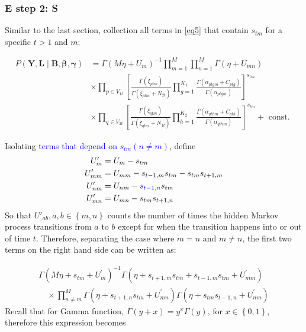 \documentclass{article}
\begin{document}
\subsubsection{E step 2: S}

Similar to the last section, collection all terms in \cref{eq5} that contain $s_{tm}$ for a specific $t>1$ and $m$:

\begin{equation*}
    \begin{aligned}
P(\mathbf{Y}, \mathbf{L} \mid \mathbf{B}, \boldsymbol{\beta}, \boldsymbol{\gamma})&=\Gamma\left(M \eta+U_{m}\right)^{-1} \prod_{m=1}^{M} \prod_{n=1}^{M} \Gamma\left(\eta+U_{m n}\right)  \\
& \times \prod_{p \in V_{1t}} \left[ \frac{\Gamma\left(\xi_{ptm}\right)}{\Gamma \left( \xi_{ptm} + N_{2t} \right)}\prod_{g=1}^{K_1}\frac{ \Gamma\left( \alpha_{ptgm} + C_{ptg} \right)}{\Gamma\left(\alpha_{ptgm}\right)}  \right]^{s_{tm}} \\
&\times \prod_{q \in V_{2t}}  \left[ \frac{\Gamma\left(\xi_{qtm}\right)}{\Gamma \left( \xi_{qtm} + N_{1t} \right)}\prod_{h=1}^{K_2}\frac{ \Gamma\left( \alpha_{qthm} + C_{qth} \right)}{\Gamma\left(\alpha_{qthm}\right)}  \right]^{s_{tm}}+\text { const. } 
    \end{aligned}
\end{equation*}


Isolating \textcolor{blue}{terms that depend on $s_{tm} (n \neq m)$}, define
$$
\begin{aligned} U_{m}^{\prime} &=U_{m}-s_{t m} \\ U_{m m}^{\prime} &=U_{m m}-s_{t-1, m} s_{t m}-s_{t m} s_{t+1, m} \\ U_{n m}^{\prime} &=U_{n m}-\textcolor{blue}{s_{t-1, n}} s_{t m} \\ U_{m n}^{\prime} &=U_{m n}-s_{t m} s_{t+1, n} \end{aligned}
$$
So that $U'_{ab}, a, b \in \left\{m,n \right\}$ counts the number of times the hidden Markov process transitions from $a$ to $b$ except for when the transition happens into or out of time $t$. Therefore, separating the case where $m = n$ and $m \neq n$, the first two terms on the right hand side can be written as:

$$
\begin{array}{l}\Gamma\left(M \eta+s_{t m}+U_{m}^{\prime}\right)^{-1} \Gamma\left(\eta+s_{t+1, m} s_{t m}+s_{t-1, m} s_{t m}+U_{m m}^{\prime}\right) \\ \quad \times \prod_{n \neq m}^{M} \Gamma\left(\eta+s_{t+1, n} s_{t m}+U_{m n}^{\prime}\right) \Gamma\left(\eta+s_{t m} s_{t-1, n}+U_{n m}^{\prime}\right)\end{array}
$$
Recall that for Gamma function, $\Gamma(y+x) = y^x\Gamma(y)$, for $x \in \left\{ 0,1\right\} $, therefore this expression becomes
\end{document}
